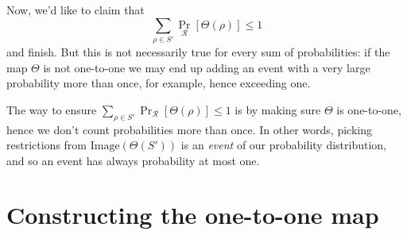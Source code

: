 Now, we'd like to claim that 
\[
\sum_{\rho \in S'} \Pr_{\mathcal{R}}[\Theta(\rho)] \leq 1
\]
and finish. But this is not necessarily true for every sum of probabilities: if the map \( \Theta \) is 
not one-to-one we may end up adding an event with a very large probability more than once, for example, 
hence exceeding one.  





The way to ensure
$\sum_{\rho \in S'} \Pr_{\mathcal{R}}[\Theta(\rho)] \leq 1
$
is by making sure \( \Theta \) is one-to-one, 
hence we don't count probabilities more than once.
In other words, picking restrictions from \(\text{Image}(\Theta(S'))\) is an \emph{event} of our probability distribution, and so an event has always probability at most one.

\section*{Constructing the one-to-one map}



